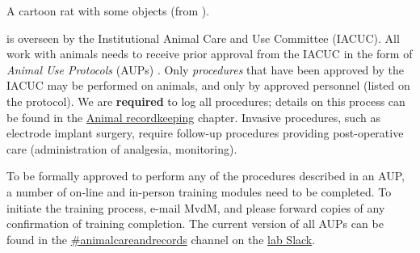 \documentclass{tufte-book}
\begin{document}
\begin{marginfigure}
\caption{A cartoon rat with some objects (from
  \citealt{Eichenbaum1999a}).}
\label{fig:rat-with-objects}
\end{marginfigure}

 is overseen by the
Institutional Animal Care and Use Committee (IACUC). All work with
animals needs to receive prior approval from the IACUC in the form of
{\it Animal Use Protocols} (AUPs) . Only {\it procedures} that have
been approved by the IACUC may be performed on animals, and only by
approved personnel (listed on the protocol). We are {\bf required} to
log all procedures; details on this process can be found in the
\hyperref[ch:animal-management]{Animal recordkeeping}
chapter. Invasive procedures, such as electrode implant surgery,
require follow-up procedures providing post-operative care
(administration of analgesia, monitoring).

To be formally approved to perform any of the procedures described in
an AUP, a number of on-line and in-person training modules need to be
completed. To initiate the training process, e-mail MvdM, and please
forward copies of any confirmation of training completion. The current
version of all AUPs can be found in the \url{#animalcareandrecords}
channel on the \href{http://mvdmlab.slack.com}{lab Slack}.
\end{document}
